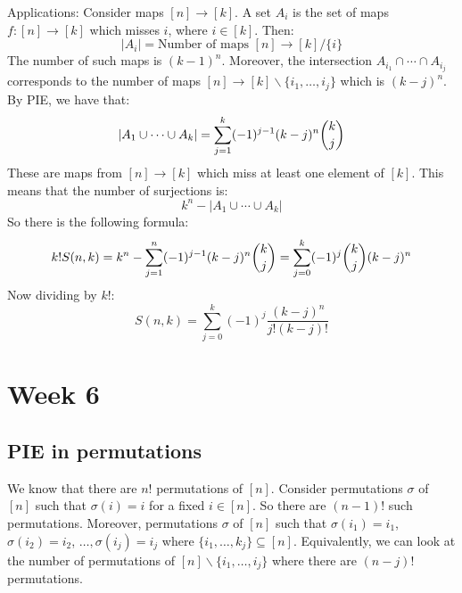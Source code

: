 \documentclass{report}
\begin{document}
Applications: Consider maps $[n] \rightarrow [k]$. A set $A_{i}$ is the set of maps $f: [n] \rightarrow [k]$ which misses $i$, where $i \in [k]$. Then:
    \begin{equation*}
        \lvert A_{i} \rvert = \text{Number of maps $[n] \rightarrow [k]/\{i\}$}
    \end{equation*}
The number of such maps is $(k - 1)^{n}$. Moreover, the intersection $A_{i_{1}} \cap \cdots \cap A_{i_{j}}$ corresponds to the number of maps $[n] \rightarrow [k]\backslash \{i_{1}, \ldots , i_{j}\}$ which is $(k - j)^{n}$. By PIE, we have that:
    \begin{equation*}
        \lvert A_{1} \cup \cdots \cup A_{k} \rvert = \sum_{j =1}^{k} (-1)^{j - 1}(k - j)^{n}\dbinom{k}{j}
    \end{equation*}
These are maps from $[n] \rightarrow [k]$ which miss at least one element of $[k]$. This means that the number of surjections is:
    \begin{equation*}
        k^{n} - \lvert A_{1} \cup  \cdots \cup A_{k} \rvert
    \end{equation*}
So there is the following formula:
    \begin{equation*}
        k!S(n, k) = k^{n} - \sum_{j = 1}^{n} (-1)^{j - 1}(k - j)^{n}\dbinom{k}{j} = \sum_{j = 0}^{k} (-1)^{j}\dbinom{k}{j}(k  - j)^{n}
    \end{equation*}
Now dividing by $k!$:
    \begin{equation*}
        S(n, k) = \sum_{j = 0}^{k} (-1)^{j}\dfrac{(k - j)^{n}}{j!(k - j)!}
    \end{equation*}

\chapter{Week 6}

\begin{topic}
    \section{PIE in permutations}
\end{topic}

We know that there are $n!$ permutations of $[n]$. Consider permutations $\sigma$ of $[n]$ such that $\sigma(i) = i$ for a fixed $i \in [n]$. So there are $(n - 1)!$ such permutations. Moreover, permutations $\sigma$ of $[n]$ such that $\sigma(i_{1}) = i_{1}$, $\sigma(i_{2}) = i_{2}$, $\ldots , \sigma(i_{j}) = i_{j}$ where $\{i_{1}, \ldots , k_{j}\} \subseteq [n]$. Equivalently, we can look at the number of permutations of $[n]\backslash \{i_{1}, \ldots , i_{j}\}$ where there are $(n -j)!$ permutations. 
\end{document}
